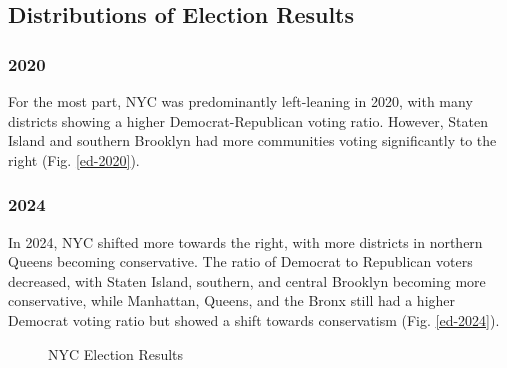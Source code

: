 \documentclass[10pt,journal,compsoc]{IEEEtran}
\begin{document}
\subsection{Distributions of Election Results}

\subsubsection{2020}
For the most part, NYC was predominantly left-leaning in 2020, with many districts showing a higher Democrat-Republican voting ratio. However, Staten Island and southern Brooklyn had more communities voting significantly to the right (Fig. \ref{ed-2020}).

\subsubsection{2024}
In 2024, NYC shifted more towards the right, with more districts in northern Queens becoming conservative. The ratio of Democrat to Republican voters decreased, with Staten Island, southern, and central Brooklyn becoming more conservative, while Manhattan, Queens, and the Bronx still had a higher Democrat voting ratio but showed a shift towards conservatism (Fig. \ref{ed-2024}).

\begin{figure}[t]
    \centering
    \caption{NYC Election Results}
\end{figure}
\end{document}
